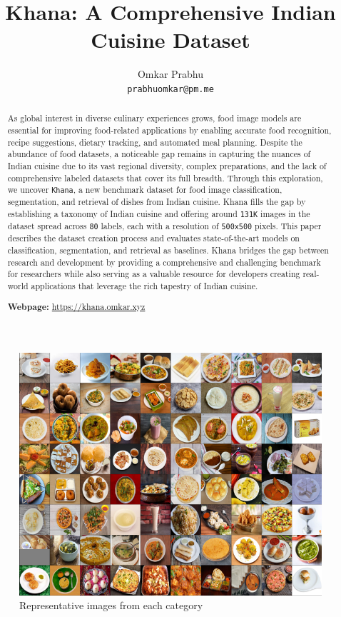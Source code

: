 \documentclass{article}
\title{\textbf{Khana: A Comprehensive Indian Cuisine Dataset}}
\author{
  Omkar Prabhu\\
  \texttt{prabhuomkar@pm.me}
}
\date{}
\begin{document}
\maketitle

\begin{abstract}

As global interest in diverse culinary experiences grows, food image models are essential for improving food-related applications by enabling accurate food recognition, recipe suggestions, dietary tracking, and automated meal planning. Despite the abundance of food datasets, a noticeable gap remains in capturing the nuances of Indian cuisine due to its vast regional diversity, complex preparations, and the lack of comprehensive labeled datasets that cover its full breadth. Through this exploration, we uncover \texttt{Khana}, a new benchmark dataset for food image classification, segmentation, and retrieval of dishes from Indian cuisine. Khana fills the gap by establishing a taxonomy of Indian cuisine and offering around \texttt{131K} images in the dataset spread across \texttt{80} labels, each with a resolution of \texttt{500x500} pixels. This paper describes the dataset creation process and evaluates state-of-the-art models on classification, segmentation, and retrieval as baselines. Khana bridges the gap between research and development by providing a comprehensive and challenging benchmark for researchers while also serving as a valuable resource for developers creating real-world applications that leverage the rich tapestry of Indian cuisine. \\

\begin{center}
\textbf{Webpage:} \url{https://khana.omkar.xyz}
\end{center}

\end{abstract}

\begin{figure}
  \centering
  \includegraphics[width=0.75\linewidth]{figs/heading.pdf}
	\caption{Representative images from each category}
	\label{fig:heading}
\end{figure}
\end{document}
